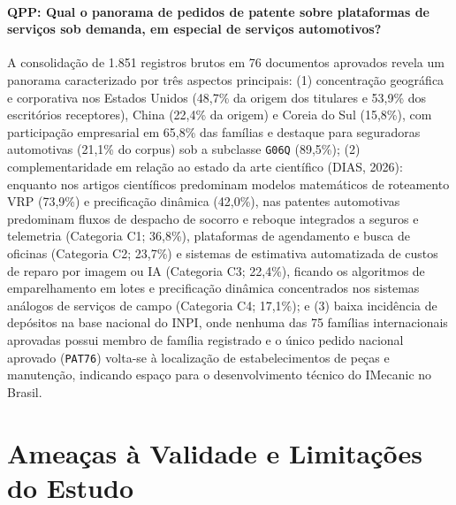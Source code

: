 \documentclass[12pt,a4paper]{article}
\begin{document}
\paragraph{QPP: Qual o panorama de pedidos de patente sobre plataformas de serviços sob demanda, em especial de serviços automotivos?}
A consolidação de 1.851 registros brutos em 76 documentos aprovados revela um panorama caracterizado por três aspectos principais: (1) concentração geográfica e corporativa nos Estados Unidos (48,7\% da origem dos titulares e 53,9\% dos escritórios receptores), China (22,4\% da origem) e Coreia do Sul (15,8\%), com participação empresarial em 65,8\% das famílias e destaque para seguradoras automotivas (21,1\% do corpus) sob a subclasse \texttt{G06Q} (89,5\%); (2) complementaridade em relação ao estado da arte científico (DIAS, 2026): enquanto nos artigos científicos predominam modelos matemáticos de roteamento VRP (73,9\%) e precificação dinâmica (42,0\%), nas patentes automotivas predominam fluxos de despacho de socorro e reboque integrados a seguros e telemetria (Categoria C1; 36,8\%), plataformas de agendamento e busca de oficinas (Categoria C2; 23,7\%) e sistemas de estimativa automatizada de custos de reparo por imagem ou IA (Categoria C3; 22,4\%), ficando os algoritmos de emparelhamento em lotes e precificação dinâmica concentrados nos sistemas análogos de serviços de campo (Categoria C4; 17,1\%); e (3) baixa incidência de depósitos na base nacional do INPI, onde nenhuma das 75 famílias internacionais aprovadas possui membro de família registrado e o único pedido nacional aprovado (\texttt{PAT76}) volta-se à localização de estabelecimentos de peças e manutenção, indicando espaço para o desenvolvimento técnico do IMecanic no Brasil.

\section{Ameaças à Validade e Limitações do Estudo}
\end{document}
